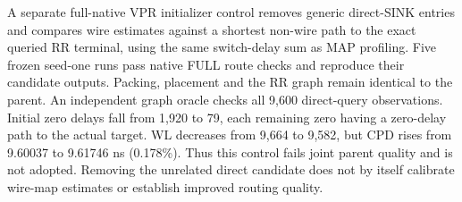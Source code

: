 \documentclass[10pt]{article}
\begin{document}
A separate full-native VPR initializer control removes generic direct-SINK
entries and compares wire estimates against a shortest non-wire path to
the exact queried RR terminal, using the same switch-delay sum as MAP
profiling. Five frozen seed-one runs pass native FULL route checks and
reproduce their candidate outputs. Packing, placement and the RR graph
remain identical to the parent. An independent graph oracle checks all
9,600 direct-query observations. Initial zero delays fall from 1,920 to
79, each remaining zero having a zero-delay path to the actual target.
WL decreases from 9,664 to 9,582, but CPD rises from 9.60037 to
9.61746 ns (0.178\%). Thus this control fails joint parent quality and
is not adopted. Removing the unrelated direct candidate does not by
itself calibrate wire-map estimates or establish improved routing quality.
\end{document}
